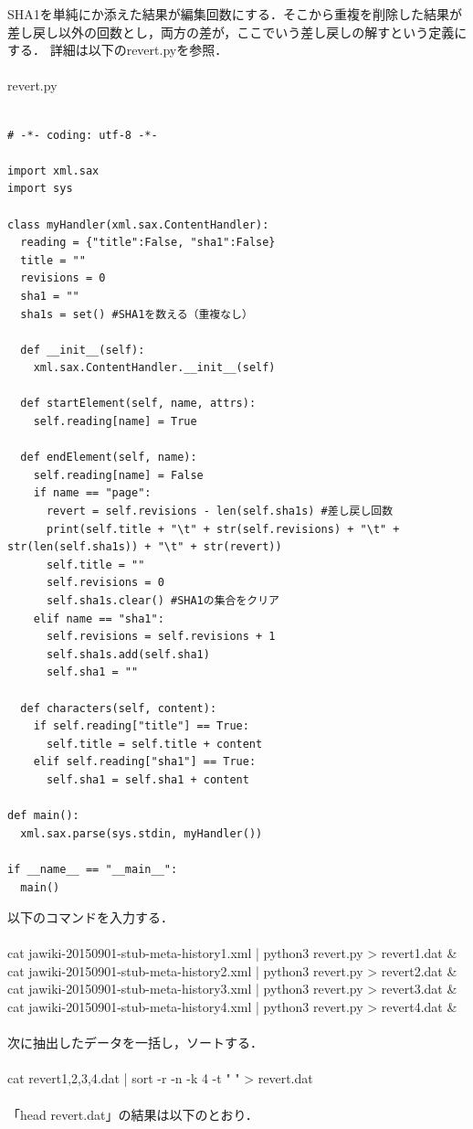 SHA1を単純にか添えた結果が編集回数にする．そこから重複を削除した結果が差し戻し以外の回数とし，両方の差が，ここでいう差し戻しの解すという定義にする．
詳細は以下のrevert.pyを参照．\\
\\
revert.py

{\small
\begin{verbatim}

# -*- coding: utf-8 -*-

import xml.sax
import sys

class myHandler(xml.sax.ContentHandler):
  reading = {"title":False, "sha1":False}
  title = ""
  revisions = 0
  sha1 = ""
  sha1s = set() #SHA1を数える（重複なし）

  def __init__(self):
    xml.sax.ContentHandler.__init__(self)
 
  def startElement(self, name, attrs):
    self.reading[name] = True
 
  def endElement(self, name):
    self.reading[name] = False
    if name == "page":
      revert = self.revisions - len(self.sha1s) #差し戻し回数
      print(self.title + "\t" + str(self.revisions) + "\t" + str(len(self.sha1s)) + "\t" + str(revert))
      self.title = ""
      self.revisions = 0
      self.sha1s.clear() #SHA1の集合をクリア
    elif name == "sha1":
      self.revisions = self.revisions + 1
      self.sha1s.add(self.sha1)
      self.sha1 = ""
 
  def characters(self, content):
    if self.reading["title"] == True:
      self.title = self.title + content
    elif self.reading["sha1"] == True:
      self.sha1 = self.sha1 + content
  
def main():
  xml.sax.parse(sys.stdin, myHandler())
 
if __name__ == "__main__":
  main()

\end{verbatim}}


以下のコマンドを入力する．\\
\\
cat jawiki-20150901-stub-meta-history1.xml | python3 revert.py > revert1.dat \& \\
cat jawiki-20150901-stub-meta-history2.xml | python3 revert.py > revert2.dat \& \\
cat jawiki-20150901-stub-meta-history3.xml | python3 revert.py > revert3.dat \& \\
cat jawiki-20150901-stub-meta-history4.xml | python3 revert.py > revert4.dat \& \\
\\
次に抽出したデータを一括し，ソートする．\\
\\
cat revert{1,2,3,4}.dat | sort -r -n -k 4 -t "  " > revert.dat \\
\\
「head revert.dat」の結果は以下のとおり．

